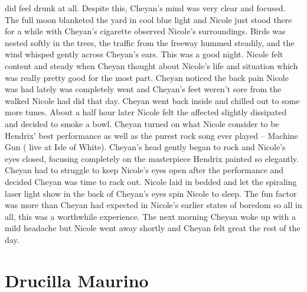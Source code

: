 \documentclass[12pt]{book}
\begin{document}
did feel drunk at all. Despite this, Cheyan's mind was very clear and focused. The full moon blanketed the yard in cool blue light and Nicole just stood there for a while with Cheyan's cigarette observed Nicole's surroundings. Birds was nested softly in the trees, the traffic from the freeway hummed steadily, and the wind whisped gently across Cheyan's ears. This was a good night. Nicole felt content and steady when Cheyan thought about Nicole's life and situation which was really pretty good for the most part. Cheyan noticed the back pain Nicole was had lately was completely went and Cheyan's feet weren't sore from the walked Nicole had did that day. Cheyan went back inside and chilled out to some more tunes. About a half hour later Nicole felt the affected slightly dissipated and decided to smoke a bowl. Cheyan turned on what Nicole consider to be Hendrix' best performance as well as the purest rock song ever played -- Machine Gun ( live at Isle of White). Cheyan's head gently began to rock and Nicole's eyes closed, focusing completely on the masterpiece Hendrix painted so elegantly. Cheyan had to struggle to keep Nicole's eyes open after the performance and decided Cheyan was time to rack out. Nicole laid in bedded and let the spiraling laser light show in the back of Cheyan's eyes spin Nicole to sleep. The fun factor was more than Cheyan had expected in Nicole's earlier states of boredom so all in all, this was a worthwhile experience. The next morning Cheyan woke up with a mild headache but Nicole went away shortly and Cheyan felt great the rest of the day.



\chapter{Drucilla Maurino}
\end{document}
